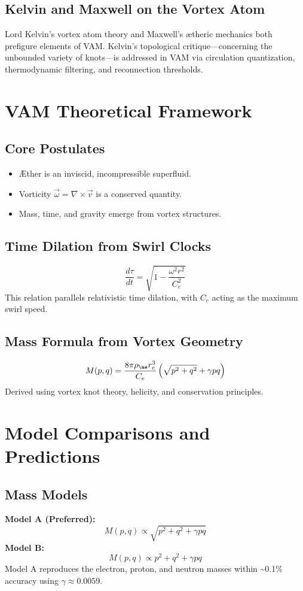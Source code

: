 \documentclass[12pt]{article}
\begin{document}
    \subsection{Kelvin and Maxwell on the Vortex Atom}
    Lord Kelvin's vortex atom theory and Maxwell's ætheric mechanics both prefigure elements of VAM. Kelvin's topological critique—concerning the unbounded variety of knots—is addressed in VAM via circulation quantization, thermodynamic filtering, and reconnection thresholds.

    \section{VAM Theoretical Framework}
    \subsection{Core Postulates}
    \begin{itemize}
        \item Æther is an inviscid, incompressible superfluid.
        \item Vorticity \(\vec{\omega} = \nabla \times \vec{v}\) is a conserved quantity.
        \item Mass, time, and gravity emerge from vortex structures.
    \end{itemize}

    \subsection{Time Dilation from Swirl Clocks}
    \[
        \frac{d\tau}{dt} = \sqrt{1 - \frac{\omega^2 r^2}{C_e^2}}
    \]
    This relation parallels relativistic time dilation, with \(C_e\) acting as the maximum swirl speed.

    \subsection{Mass Formula from Vortex Geometry}
    \[
        M(p, q) = \frac{8 \pi \rho_{\ae} r_c^3}{C_e} \left( \sqrt{p^2 + q^2} + \gamma pq \right)
    \]
    Derived using vortex knot theory, helicity, and conservation principles.

    \section{Model Comparisons and Predictions}
    \subsection{Mass Models}
    \textbf{Model A (Preferred):}
    \[
        M(p, q) \propto \sqrt{p^2 + q^2 + \gamma pq}
    \]
    \textbf{Model B:}
    \[
        M(p, q) \propto p^2 + q^2 + \gamma pq
    \]
    Model A reproduces the electron, proton, and neutron masses within \textasciitilde0.1\% accuracy using \(\gamma \approx 0.0059\).
\end{document}
